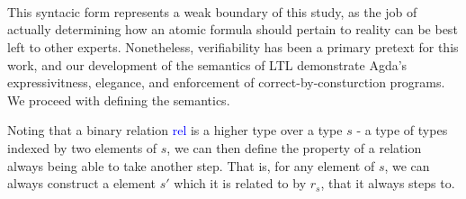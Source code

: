 \documentclass[a4paper, 11pt]{article}
\newcommand{\blue}[1]{\textcolor{blue}{#1}}
\begin{document}
\begin{code}[hide]%
\>[0]\<%
\\
\>[0]\AgdaSpace{}%
\AgdaSymbol{:}\AgdaSpace{}%
\AgdaSpace{}%
\AgdaSpace{}%
\<%
\\
\>[0]\AgdaSpace{}%
\AgdaSpace{}%
\AgdaSymbol{=}\AgdaSpace{}%
\AgdaSpace{}%
\AgdaSpace{}%
\<%
\\
%
\\[\AgdaEmptyExtraSkip]%
\>[0]\<%
\\
\>[0]\<%
\\
\>[0]\AgdaSpace{}%
\AgdaSymbol{:}\AgdaSpace{}%
\AgdaSpace{}%
\<%
\\
\>[0]\AgdaSpace{}%
\AgdaSpace{}%
\AgdaSymbol{=}\AgdaSpace{}%
\<%
\\
\>[0]\AgdaSpace{}%
\AgdaSpace{}%
\AgdaSymbol{=}\AgdaSpace{}%
\<%
\end{code}

This syntacic form represents a weak boundary of this study, as the job of actually
determining how an atomic formula should pertain to reality can be best left to other
experts. Nonetheless, verifiability has been a primary pretext for this work,
and our development of the semantics of LTL demonstrate Agda's expressivitness,
elegance, and enforcement of correct-by-consturction programs. We proceed with defining the semantics.

Noting that a binary relation \blue{rel} is a higher type over a type $s$ - a
type of types indexed by two elements of $s$, we can then define the property of
a relation always being able to take another step. That is, for any element of
$s$, we can always construct a element $s'$ which it is related to by $r_s$,
that it always steps to.
\end{document}
